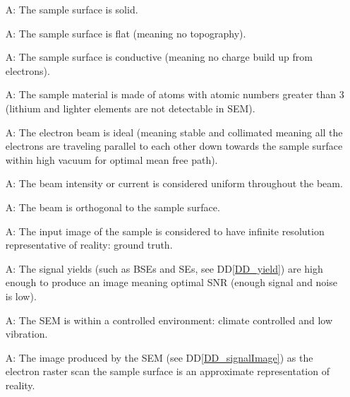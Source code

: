 \documentclass[12pt]{article}
\newcommand{\ddref}[1]{DD\ref{#1}}
\newcounter{assumpnum} %
\begin{document}
\begin{itemize}

\item[A\refstepcounter{assumpnum}\theassumpnum \label{A_sampleSolid}:] The sample 
surface is solid.

\item[A\refstepcounter{assumpnum}\theassumpnum \label{A_sampleTopo}:] The sample 
surface is flat (meaning no topography).

\item[A\refstepcounter{assumpnum}\theassumpnum \label{A_sampleConductive}:] The sample 
surface is conductive (meaning no charge build up from electrons).

\item[A\refstepcounter{assumpnum}\theassumpnum \label{A_sampleZ}:] The sample 
material is made of atoms with atomic numbers greater than 3 (lithium and lighter elements are not detectable in SEM).

\item[A\refstepcounter{assumpnum}\theassumpnum \label{A_beam}:] The electron 
beam is ideal (meaning stable and collimated meaning all the electrons are 
traveling parallel to each other down towards the sample surface within high 
vacuum for optimal mean free path).

\item[A\refstepcounter{assumpnum}\theassumpnum \label{A_beam1}:] The beam 
intensity or current is considered uniform throughout the beam.

\item[A\refstepcounter{assumpnum}\theassumpnum \label{A_beam2}:] The beam is orthogonal to the sample surface.

\item[A\refstepcounter{assumpnum}\theassumpnum \label{A_inputImage}:] The input 
image of the sample is considered to have infinite resolution representative of reality: ground truth.

\item[A\refstepcounter{assumpnum}\theassumpnum \label{A_yield}:] The signal yields (such as BSEs and SEs, see \ddref{DD_yield})
are high enough to produce an image meaning optimal SNR (enough signal and noise is low).

\item[A\refstepcounter{assumpnum}\theassumpnum \label{A_environment}:] The SEM 
is within a controlled environment: climate controlled and low vibration.

\item[A\refstepcounter{assumpnum}\theassumpnum \label{A_reality}:] The image 
produced by the SEM (see \ddref{DD_signalImage}) as the electron raster scan the sample surface is an 
approximate representation of reality.

\end{itemize}
\end{document}
